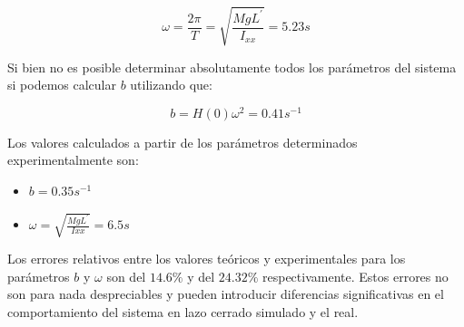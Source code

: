 \documentclass[main]{subfiles}
\begin{document}
\begin{equation}
\omega = \frac{2\pi}{T} = \sqrt{\frac{MgL^\prime}{I_{xx}}}=5.23 s
\end{equation}

Si bien no es posible determinar absolutamente todos los par\'ametros del sistema si podemos calcular $b$ utilizando que:

\begin{equation}
b = H(0)\omega^2 = 0.41 s^{-1}
\end{equation}

Los valores calculados a partir de los par\'ametros determinados experimentalmente son:
\begin{itemize}
	\item $b = 0.35 s^{-1}$
	\item $\omega = \sqrt{\frac{MgL^\prime}{Ixx}} = 6.5s$
\end{itemize}

Los errores relativos entre los valores te\'oricos y experimentales para los par\'ametros $b$ y $\omega$ son del $14.6\%$ y del $24.32\%$ respectivamente. Estos errores no son para nada despreciables y pueden introducir diferencias significativas en el comportamiento del sistema en lazo cerrado simulado y el real.\\

  
\end{document}
